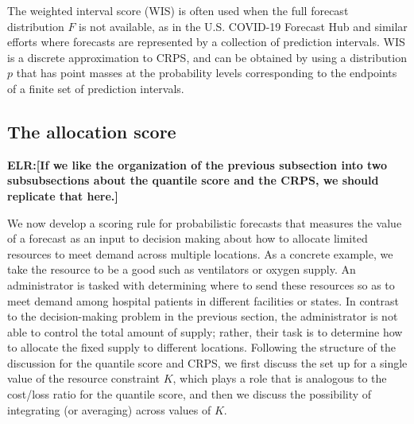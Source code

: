 \documentclass{article}
\def\elr#1{{\color{cyan}\textbf{ELR:[#1]}}}
\def\apg#1{{\color{red}\textbf{APG:[#1]}}}
\begin{document}
The weighted interval score (WIS) is often used when the full forecast distribution $F$ is not available, as in the U.S. COVID-19 Forecast Hub and similar efforts where forecasts are represented by a collection of prediction intervals. WIS is a discrete approximation to CRPS, and can be obtained by using a distribution $p$ that has point masses at the probability levels corresponding to the endpoints of a finite set of prediction intervals.


\subsection{The allocation score}
\label{sec:methods.allocation}

\elr{If we like the organization of the previous subsection into two subsubsections about the quantile score and the CRPS, we should replicate that here.}

We now develop a scoring rule for probabilistic forecasts that measures the value of a forecast as an input to decision making about how to allocate limited resources to meet demand across multiple locations. As a concrete example, we take the resource to be a good such as ventilators or oxygen supply. An administrator is tasked with determining where to send these resources so as to meet demand among hospital patients in different facilities or states. In contrast to the decision-making problem in the previous section, the administrator is not able to control the total amount of supply; rather, their task is to determine how to allocate the fixed supply to different locations. Following the structure of the discussion for the quantile score and CRPS, we first discuss the set up for a single value of the resource constraint $K$, which plays a role that is analogous to the cost/loss ratio for the quantile score, and then we discuss the possibility of integrating (or averaging) across values of $K$.
\end{document}
